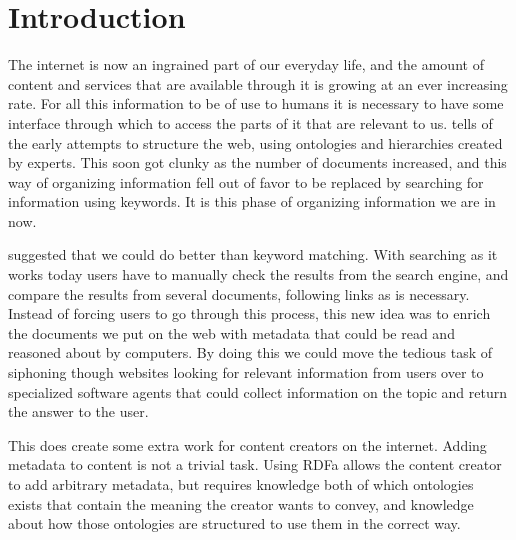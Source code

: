 
\chapter{Introduction} %

\label{Introduction}



The internet is now an ingrained part of our everyday life,
and the amount of content and services that are available through it is growing at an ever increasing rate.
For all this information to be of use to humans it is necessary to have some interface through which to access the parts of it that are relevant to us.
\citet{Shirky2007} tells of the early attempts to structure the web,
using ontologies and hierarchies created by experts.
This soon got clunky as the number of documents increased,
and this way of organizing information fell out of favor to be replaced by searching for information using keywords.
It is this phase of organizing information we are in now.

\citet{Berners-Lee2001} suggested that we could do better than keyword matching.
With searching as it works today users have to manually check the results from the search engine,
and compare the results from several documents, following links as is necessary.
Instead of forcing users to go through this process,
this new idea was to enrich the documents we put on the web with metadata that could be read and reasoned about by computers.
By doing this we could move the tedious task of siphoning though websites looking for relevant information from users
over to specialized software agents that could collect information on the topic and return the answer to the user.

This does create some extra work for content creators on the internet.
Adding metadata to content is not a trivial task.
Using RDFa allows the content creator to add arbitrary metadata,
but requires knowledge both of which ontologies exists that contain the meaning the creator wants to convey,
and knowledge about how those ontologies are structured to use them in the correct way.


